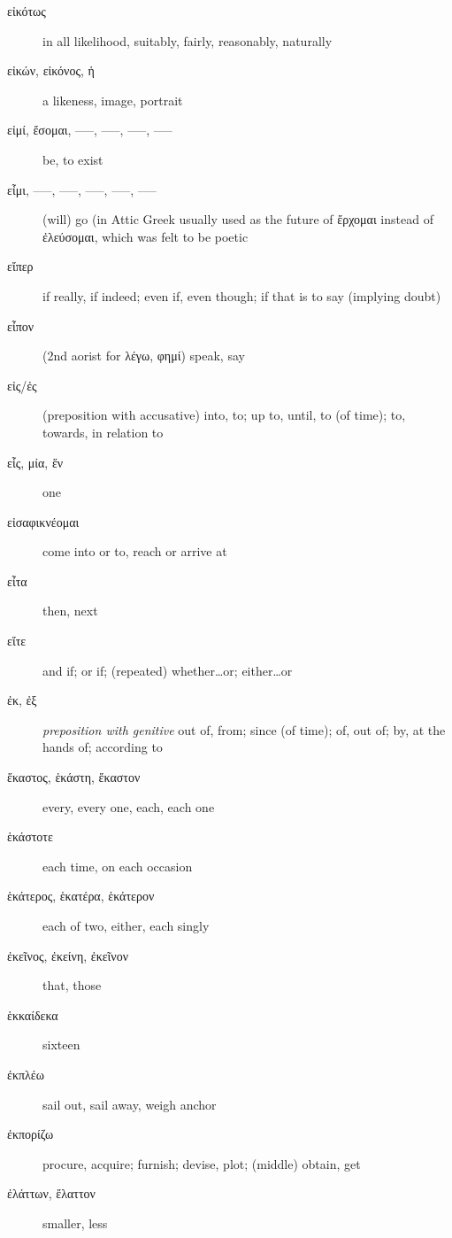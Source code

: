 \documentclass[12pt,letterpaper]{article}
\begin{document}
\begin{description}
    \item[\textgreek{εἰκότως}] in all likelihood, suitably, fairly, reasonably, naturally
    \item[\textgreek{εἰκών, εἰκόνος, ἡ}] a likeness, image, portrait
    \item[\textgreek{εἰμί, ἔσομαι, –––, –––, –––, –––}] \marginnote{*}be, to exist
    \item[\textgreek{εἶμι, –––, –––, –––, –––, –––}] \marginnote{*}(will) go (in Attic Greek usually used as the future of \textgreek{ἔρχομαι} instead of \textgreek{ἐλεύσομαι}, which was felt to be poetic
    \item[\textgreek{εἴπερ}] if really, if indeed; even if, even though; if that is to say (implying doubt)
    \item[\textgreek{εἶπον}] \marginnote{*}(2nd aorist for \textgreek{λέγω, φημί}) speak, say
    \item[\textgreek{εἰς/ἐς}] \marginnote{*}(preposition with accusative) into, to; up to, until, to (of time); to, towards, in relation to
    \item[\textgreek{εἷς, μία, ἕν}] \marginnote{*}one
    \item[\textgreek{εἰσαφικνέομαι}] come into or to, reach or arrive at
    \item[\textgreek{εἶτα}] \marginnote{*}then, next
    \item[\textgreek{εἴτε}] \marginnote{*}and if; or if; (repeated) whether\dots or; either\dots or
    \item[\textgreek{ἐκ, ἐξ}] \marginnote{*}\textit{preposition with genitive} out of, from; since (of time); of, out of; by, at the hands of; according to
    \item[\textgreek{ἕκαστος, ἑκάστη, ἕκαστον}] \marginnote{*}every, every one, each, each one
    \item[\textgreek{ἑκάστοτε}] each time, on each occasion
    \item[\textgreek{ἑκάτερος, ἑκατέρα, ἑκάτερον}] \marginnote{*}each of two, either, each singly
    \item[\textgreek{ἐκεῖνος, ἐκείνη, ἐκεῖνον}] \marginnote{*}that, those
    \item[\textgreek{ἑκκαίδεκα}] sixteen
    \item[\textgreek{ἐκπλέω}] sail out, sail away, weigh anchor
    \item[\textgreek{ἐκπορίζω}] procure, acquire; furnish; devise, plot; (middle) obtain, get
    \item[\textgreek{ἐλάττων, ἔλαττον}] \marginnote{*}smaller, less

\end{description}
\end{document}
